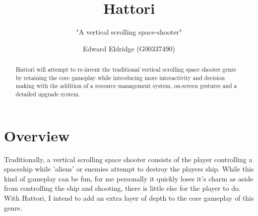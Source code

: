 \documentclass[a4paper]{scrreprt}
\title{Hattori}
\subtitle{"A vertical scrolling space-shooter"}
\author{Edward Eldridge (G00337490)}
\begin{document}
\maketitle

\begin{abstract}

 Hattori will attempt to re-invent the traditional vertical scrolling space shooter genre by retaining the core gameplay while introducing more interactivity and decision making with the addition of a resource management system, on-screen gestures and a detailed upgrade system. 

\end{abstract}

{
  \hypersetup{linkcolor=black}
  \tableofcontents
}

\chapter{Overview}

Traditionally, a vertical scrolling space shooter consists of the player controlling a spaceship while 'aliens' or enemies attempt to destroy the players ship.
While this kind of gameplay can be fun, for me personally it quickly loses it's charm as aside from controlling the ship and shooting, there is little else for the player to do. With Hattori, I intend to add an extra layer of depth to the core gameplay of this genre.
\end{document}
